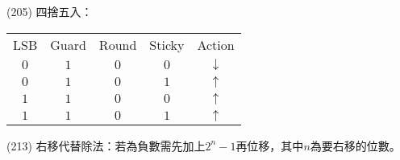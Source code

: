 \item \begin{theorem}{(205)} 四捨五入：\begin{table}[H]
        \centering
        \begin{tabular}{|c|c|c|c|c|}
            \hline
            LSB & Guard & Round & Sticky & Action \\
            \Xhline{2\arrayrulewidth}
            $0$ & $1$ & $0$ & $0$ & $\downarrow$ \\
            \hline
            $0$ & $1$ & $0$ & $1$ & $\uparrow$ \\
            \hline
            $1$ & $1$ & $0$ & $0$ & $\uparrow$ \\
            \hline
            $1$ & $1$ & $0$ & $1$ & $\uparrow$ \\
            \hline
        \end{tabular}
    \end{table}
\end{theorem}

\item \begin{theorem}{(213)} 右移代替除法：若為負數需先加上$2^n - 1$再位移，其中$n$為要右移的位數。
\end{theorem}
